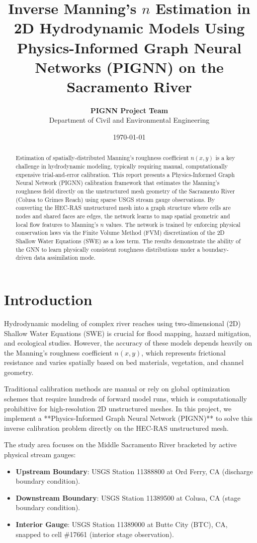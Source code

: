 \documentclass[11pt,a4paper]{article}
\title{\textbf{Inverse Manning's $n$ Estimation in 2D Hydrodynamic Models Using Physics-Informed Graph Neural Networks (PIGNN) on the Sacramento River}}
\author{\textbf{PIGNN Project Team} \\
\small Department of Civil and Environmental Engineering}
\date{\today}
\begin{document}
\maketitle

\begin{abstract}
Estimation of spatially-distributed Manning's roughness coefficient $n(x,y)$ is a key challenge in hydrodynamic modeling, typically requiring manual, computationally expensive trial-and-error calibration. This report presents a Physics-Informed Graph Neural Network (PIGNN) calibration framework that estimates the Manning's roughness field directly on the unstructured mesh geometry of the Sacramento River (Colusa to Grimes Reach) using sparse USGS stream gauge observations. By converting the HEC-RAS unstructured mesh into a graph structure where cells are nodes and shared faces are edges, the network learns to map spatial geometric and local flow features to Manning's $n$ values. The network is trained by enforcing physical conservation laws via the Finite Volume Method (FVM) discretization of the 2D Shallow Water Equations (SWE) as a loss term. The results demonstrate the ability of the GNN to learn physically consistent roughness distributions under a boundary-driven data assimilation mode.
\end{abstract}

\section{Introduction}
Hydrodynamic modeling of complex river reaches using two-dimensional (2D) Shallow Water Equations (SWE) is crucial for flood mapping, hazard mitigation, and ecological studies. However, the accuracy of these models depends heavily on the Manning's roughness coefficient $n(x,y)$, which represents frictional resistance and varies spatially based on bed materials, vegetation, and channel geometry. 

Traditional calibration methods are manual or rely on global optimization schemes that require hundreds of forward model runs, which is computationally prohibitive for high-resolution 2D unstructured meshes. In this project, we implement a **Physics-Informed Graph Neural Network (PIGNN)** to solve this inverse calibration problem directly on the HEC-RAS unstructured mesh.

The study area focuses on the Middle Sacramento River bracketed by active physical stream gauges:
\begin{itemize}
    \item \textbf{Upstream Boundary}: USGS Station 11388800 at Ord Ferry, CA (discharge boundary condition).
    \item \textbf{Downstream Boundary}: USGS Station 11389500 at Colusa, CA (stage boundary condition).
    \item \textbf{Interior Gauge}: USGS Station 11389000 at Butte City (BTC), CA, snapped to cell \#17661 (interior stage observation).
\end{itemize}
\end{document}
